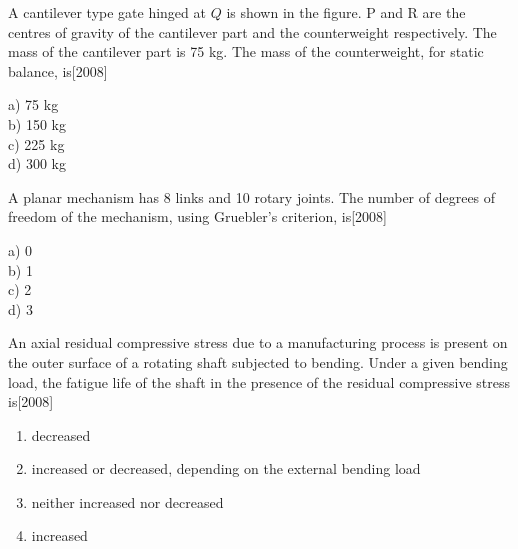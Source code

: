 \item A cantilever type gate hinged at $Q$ is shown in the figure. P and R are the centres of gravity of the cantilever part and the counterweight respectively. The mass of the cantilever part is 75 kg. The mass of the counterweight, for static balance, is\hfill{[2008]}

\begin{center}
   
\end{center}

\begin{multicols}{4}
     a) 75 kg\\
     b) 150 kg\\
     c) 225 kg\\
     d) 300 kg
 \end{multicols}

\item A planar mechanism has 8 links and 10 rotary joints. The number of degrees of freedom of the mechanism, using Gruebler's criterion, is\hfill{[2008]}
\begin{multicols}{4}
     a) 0\\
     b) 1\\
     c) 2\\
     d) 3
 \end{multicols}

\item An axial residual compressive stress due to a manufacturing process is present on the outer surface of a rotating shaft subjected to bending. Under a given bending load, the fatigue life of the shaft in the presence of the residual compressive stress is\hfill{[2008]}
\begin{enumerate}
    \item decreased
    \item increased or decreased, depending on the external bending load
    \item neither increased nor decreased
    \item increased
\end{enumerate}

